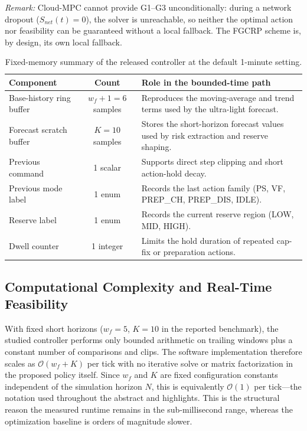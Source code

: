 \documentclass[preprint,12pt]{elsarticle}
\def\texttt#1{#1}%
\begin{document}
\textit{Remark:} Cloud-MPC cannot provide G1--G3 unconditionally: during a network dropout ($S_{net}(t)=0$), the solver is unreachable, so neither the optimal action nor feasibility can be guaranteed without a local fallback. The FGCRP scheme is, by design, its own local fallback.

\begin{table}[H]
\centering
\caption{Fixed-memory summary of the released controller at the default 1-minute setting.}
\label{tab:fixed_memory}
\footnotesize
\setlength{\tabcolsep}{4pt}
\begin{tabularx}{\textwidth}{@{} l c Y @{}}
\toprule
Component & Count & Role in the bounded-time path \\
\midrule
Base-history ring buffer & $w_f + 1 = 6$ samples & Reproduces the moving-average and trend terms used by the ultra-light forecast. \\
Forecast scratch buffer & $K = 10$ samples & Stores the short-horizon forecast values used by risk extraction and reserve shaping. \\
Previous command & 1 scalar & Supports direct step clipping and short action-hold decay. \\
Previous mode label & 1 enum & Records the last action family (\texttt{PS}, \texttt{VF}, \texttt{PREP\_CH}, \texttt{PREP\_DIS}, \texttt{IDLE}). \\
Reserve label & 1 enum & Records the current reserve region (\texttt{LOW}, \texttt{MID}, \texttt{HIGH}). \\
Dwell counter & 1 integer & Limits the hold duration of repeated cap-fix or preparation actions. \\
\bottomrule
\end{tabularx}
\end{table}

\subsection{Computational Complexity and Real-Time Feasibility}
With fixed short horizons ($w_f=5$, $K=10$ in the reported benchmark), the studied controller performs only bounded arithmetic on trailing windows plus a constant number of comparisons and clips. The software implementation therefore scales as $\mathcal{O}(w_f+K)$ per tick with no iterative solve or matrix factorization in the proposed policy itself. Since $w_f$ and $K$ are fixed configuration constants independent of the simulation horizon $N$, this is equivalently $\mathcal{O}(1)$ per tick---the notation used throughout the abstract and highlights. This is the structural reason the measured runtime remains in the sub-millisecond range, whereas the optimization baseline is orders of magnitude slower.
\end{document}
